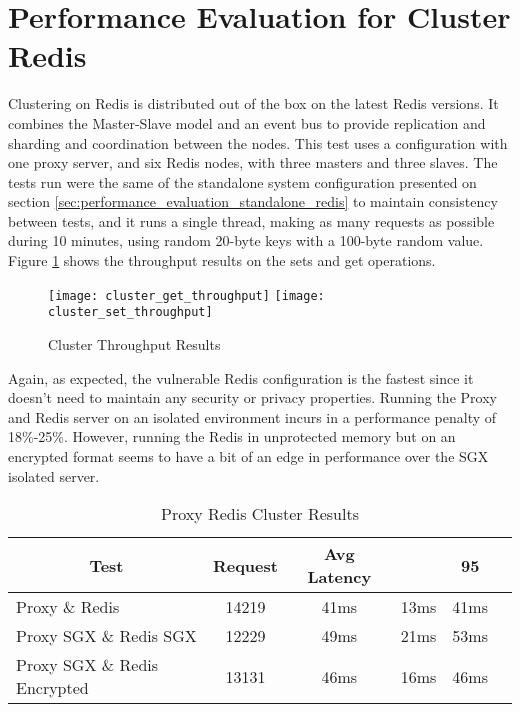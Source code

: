 \section{Performance Evaluation for Cluster Redis}
\label{sec:performance_evaluation_cluster_redis}

Clustering on Redis is distributed out of the box on the latest Redis versions. It combines the Master-Slave model and an event bus to provide replication and sharding and coordination between the nodes. This test uses a configuration with one proxy server, and six Redis nodes, with three masters and three slaves. The tests run were the same of the standalone system configuration presented on section \ref{sec:performance_evaluation_standalone_redis} to maintain consistency between tests, and it runs a single thread, making as many requests as possible during 10 minutes, using random 20-byte keys with a 100-byte random value. Figure \ref{fig:cluster_throughput_results} shows the throughput results on the sets and get operations.

\begin{figure}[htbp]
  \centering
    {\texttt{[image: cluster\_get\_throughput]}}%
    {\texttt{[image: cluster\_set\_throughput]}}%
  \caption{Cluster Throughput Results}
  \label{fig:cluster_throughput_results}
\end{figure}

Again, as expected, the vulnerable Redis configuration is the fastest since it doesn't need to maintain any security or privacy properties. Running the Proxy and Redis server on an isolated environment incurs in a performance penalty of 18\%-25\%. However, running the Redis in unprotected memory but on an encrypted format seems to have a bit of an edge in performance over the \gls{SGX} isolated server.

\begin{table}[ht]
	\caption{Proxy Redis Cluster Results}
	\label{tab:proxy_redis_cluster_latency_results}
\centering
\begin{tabular}{lccccc}
	\toprule
	\multicolumn{1}{c}{\textbf{Test}} & \pmb{\#}\textbf{Request} & \textbf{Avg Latency} & \pmb{\ensuremath{\sigma}} & \textbf{95}\pmb{\%} \\
	\midrule
		Proxy \& Redis & 14219 & 41ms & 13ms & 41ms  				\\
		Proxy SGX \& Redis SGX & 12229 & 49ms & 21ms & 53ms  		\\
		Proxy SGX \& Redis Encrypted & 13131 & 46ms & 16ms & 46ms 	\\
	\bottomrule
\end{tabular}
\end{table}

